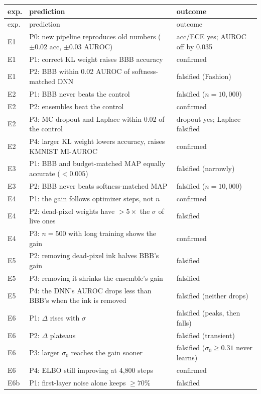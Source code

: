 \documentclass[11pt]{article}
\begin{document}
{\small
\begin{longtable}{p{0.9cm}p{8.6cm}p{4.6cm}}
\toprule
exp. & prediction & outcome \\
\midrule
\endfirsthead
\toprule
exp. & prediction & outcome \\
\midrule
\endhead
\bottomrule
\endlastfoot
E1 & P0: new pipeline reproduces old numbers ($\pm0.02$ acc, $\pm0.03$ AUROC) & acc/ECE yes; AUROC off by 0.035 \\
E1 & P1: correct KL weight raises BBB accuracy & confirmed \\
E1 & P2: BBB within 0.02 AUROC of softness-matched DNN & falsified (Fashion) \\
E2 & P1: BBB never beats the control & falsified ($n=10{,}000$) \\
E2 & P2: ensembles beat the control & confirmed \\
E2 & P3: MC dropout and Laplace within 0.02 of the control & dropout yes; Laplace falsified \\
E2 & P4: larger KL weight lowers accuracy, raises KMNIST MI-AUROC & confirmed \\
E3 & P1: BBB and budget-matched MAP equally accurate ($<0.005$) & falsified (narrowly) \\
E3 & P2: BBB never beats softness-matched MAP & falsified ($n=10{,}000$) \\
E4 & P1: the gain follows optimizer steps, not $n$ & confirmed \\
E4 & P2: dead-pixel weights have $>5\times$ the $\sigma$ of live ones & falsified \\
E4 & P3: $n=500$ with long training shows the gain & confirmed \\
E5 & P2: removing dead-pixel ink halves BBB's gain & falsified \\
E5 & P3: removing it shrinks the ensemble's gain & falsified \\
E5 & P4: the DNN's AUROC drops less than BBB's when the ink is removed & falsified (neither drops) \\
E6 & P1: $\Delta$ rises with $\sigma$ & falsified (peaks, then falls) \\
E6 & P2: $\Delta$ plateaus & falsified (transient) \\
E6 & P3: larger $\sigma_0$ reaches the gain sooner & falsified ($\sigma_0\ge0.31$ never learns) \\
E6 & P4: ELBO still improving at 4{,}800 steps & confirmed \\
E6b & P1: first-layer noise alone keeps $\ge70\%$ & falsified \\

\end{longtable}}
\end{document}
